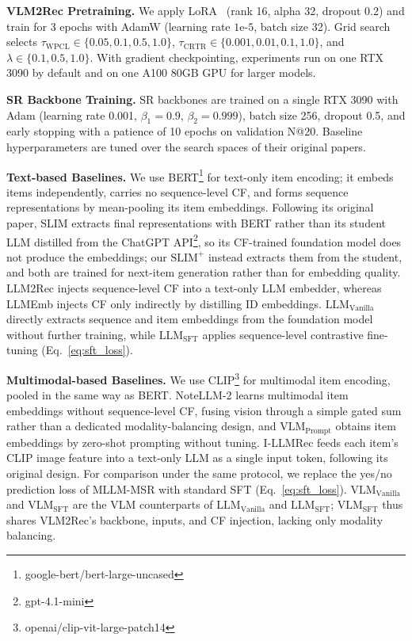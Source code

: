 \vspace{+0.1cm}
\noindent\textbf{VLM2Rec Pretraining.}
\label{app:implementation_details}
We apply LoRA~\cite{lora} (rank 16, alpha 32, dropout 0.2) and train for 3 epochs with AdamW (learning rate $1\text{e-}5$, batch size 32).
Grid search selects
$\tau_{\text{WPCL}} \in \{0.05, 0.1, 0.5, 1.0\}$,
$\tau_{\text{CRTR}} \in \{0.001, 0.01, 0.1, 1.0\}$, and
$\lambda \in \{0.1, 0.5, 1.0\}$.
With gradient checkpointing, experiments run on one RTX 3090 by default and on one A100 80GB GPU for larger models.

\vspace{+0.1cm}
\noindent\textbf{SR Backbone Training.}
SR backbones are trained on a single RTX 3090 with Adam (learning rate 0.001, $\beta_1=0.9$, $\beta_2=0.999$), batch size 256, dropout 0.5, and early stopping with a patience of 10 epochs on validation N@20.
Baseline hyperparameters are tuned over the search spaces of their original papers.

\vspace{+0.1cm}
\noindent\textbf{Text-based Baselines.}
We use BERT\footnote{google-bert/bert-large-uncased} for text-only item encoding; it embeds items independently, carries no sequence-level CF, and forms sequence representations by mean-pooling its item embeddings.
Following its original paper, SLIM extracts final representations with BERT rather than its student LLM distilled from the ChatGPT API\footnote{gpt-4.1-mini}, so its CF-trained foundation model does not produce the embeddings; our $\text{SLIM}^{+}$ instead extracts them from the student, and both are trained for next-item generation rather than for embedding quality.
LLM2Rec injects sequence-level CF into a text-only LLM embedder, whereas LLMEmb injects CF only indirectly by distilling ID embeddings.
$\text{LLM}_{\text{Vanilla}}$ directly extracts sequence and item embeddings from the foundation model without further training, while $\text{LLM}_{\text{SFT}}$ applies sequence-level contrastive fine-tuning (Eq.~\ref{eq:sft_loss}).

\vspace{+0.1cm}
\noindent\textbf{Multimodal-based Baselines.}
We use CLIP\footnote{openai/clip-vit-large-patch14} for multimodal item encoding, pooled in the same way as BERT.
NoteLLM-2 learns multimodal item embeddings without sequence-level CF, fusing vision through a simple gated sum rather than a dedicated modality-balancing design, and $\text{VLM}_{\text{Prompt}}$ obtains item embeddings by zero-shot prompting without tuning.
I-LLMRec feeds each item's CLIP image feature into a text-only LLM as a single input token, following its original design.
For comparison under the same protocol, we replace the yes/no prediction loss of MLLM-MSR with standard SFT (Eq.~\ref{eq:sft_loss}).
$\text{VLM}_{\text{Vanilla}}$ and $\text{VLM}_{\text{SFT}}$ are the VLM counterparts of $\text{LLM}_{\text{Vanilla}}$ and $\text{LLM}_{\text{SFT}}$; $\text{VLM}_{\text{SFT}}$ thus shares VLM2Rec's backbone, inputs, and CF injection, lacking only modality balancing.

